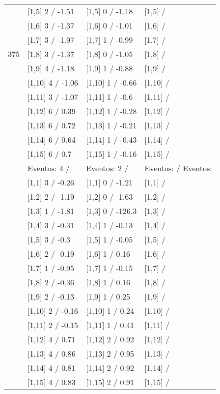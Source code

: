 \begin{table}
\begin{tabular}[t]{llll}
 & {}[1,5] 2  / -1.51 & {}[1,5] 0  / -1.18 & {}[1,5]  /\\
 & {}[1,6] 3  / -1.37 & {}[1,6] 0  / -1.01 & {}[1,6]  /\\
 & {}[1,7] 3  / -1.97 & {}[1,7] 1  / -0.99 & {}[1,7]  /\\
375 & {}[1,8] 3  / -1.37 & {}[1,8] 0  / -1.05 & {}[1,8]  /\\
\addlinespace
 & {}[1,9] 4  / -1.18 & {}[1,9] 1  / -0.88 & {}[1,9]  /\\
 & {}[1,10] 4  / -1.06 & {}[1,10] 1  / -0.66 & {}[1,10]  /\\
 & {}[1,11] 3  / -1.07 & {}[1,11] 1  / -0.6 & {}[1,11]  /\\
 & {}[1,12] 6  / 0.39 & {}[1,12] 1  / -0.28 & {}[1,12]  /\\
 & {}[1,13] 6  / 0.72 & {}[1,13] 1  / -0.21 & {}[1,13]  /\\
\addlinespace
 & {}[1,14] 6  / 0.64 & {}[1,14] 1  / -0.43 & {}[1,14]  /\\
 & {}[1,15] 6  / 0.7 & {}[1,15] 1  / -0.16 & {}[1,15]  /\\
 & Eventos:  4 / & Eventos:  2 / & Eventos:   / Eventos:\\
 & {}[1,1] 3  / -0.26 & {}[1,1] 0  / -1.21 & {}[1,1]  /\\
 & {}[1,2] 2  / -1.19 & {}[1,2] 0  / -1.63 & {}[1,2]  /\\
\addlinespace
 & {}[1,3] 1  / -1.81 & {}[1,3] 0  / -126.3 & {}[1,3]  /\\
 & {}[1,4] 3  / -0.31 & {}[1,4] 1  / -0.13 & {}[1,4]  /\\
 & {}[1,5] 3  / -0.3 & {}[1,5] 1  / -0.05 & {}[1,5]  /\\
 & {}[1,6] 2  / -0.19 & {}[1,6] 1  / 0.16 & {}[1,6]  /\\
 & {}[1,7] 1  / -0.95 & {}[1,7] 1  / -0.15 & {}[1,7]  /\\
\addlinespace
500 & {}[1,8] 2  / -0.36 & {}[1,8] 1  / 0.16 & {}[1,8]  /\\
 & {}[1,9] 2  / -0.13 & {}[1,9] 1  / 0.25 & {}[1,9]  /\\
 & {}[1,10] 2  / -0.16 & {}[1,10] 1  / 0.24 & {}[1,10]  /\\
 & {}[1,11] 2  / -0.15 & {}[1,11] 1  / 0.41 & {}[1,11]  /\\
 & {}[1,12] 4  / 0.71 & {}[1,12] 2  / 0.92 & {}[1,12]  /\\
\addlinespace
 & {}[1,13] 4  / 0.86 & {}[1,13] 2  / 0.95 & {}[1,13]  /\\
 & {}[1,14] 4  / 0.81 & {}[1,14] 2  / 0.92 & {}[1,14]  /\\
 & {}[1,15] 4  / 0.83 & {}[1,15] 2  / 0.91 & {}[1,15]  /\\
\bottomrule
\end{tabular}
\end{table}
